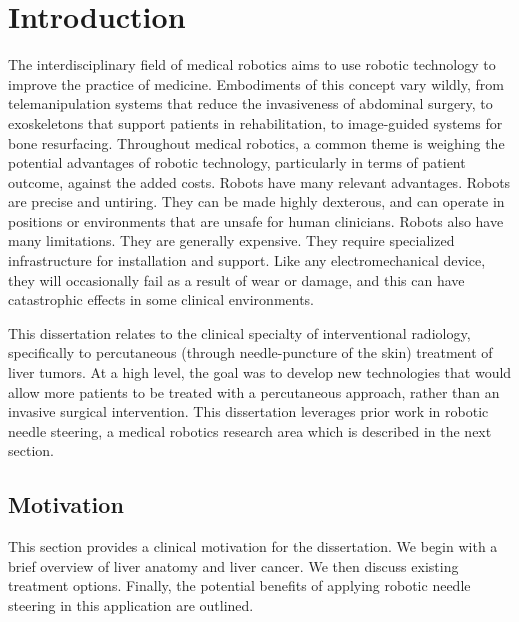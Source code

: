 \chapter{Introduction}
The interdisciplinary field of medical robotics aims to use robotic technology to improve the practice of medicine. Embodiments of this concept vary wildly, from telemanipulation systems that reduce the invasiveness of abdominal surgery, to exoskeletons that support patients in rehabilitation, to image-guided systems for bone resurfacing. Throughout medical robotics, a common theme is weighing the potential advantages of robotic technology, particularly in terms of patient outcome, against the added costs. Robots have many relevant advantages. Robots are precise and untiring. They can be made highly dexterous, and can operate in positions or environments that are unsafe for human clinicians. Robots also have many limitations. They are generally expensive. They require specialized infrastructure for installation and support. Like any electromechanical device, they will occasionally fail as a result of wear or damage, and this can have catastrophic effects in some clinical environments. 

This dissertation relates to the clinical specialty of interventional radiology, specifically to percutaneous (through needle-puncture of the skin) treatment of liver tumors. At a high level, the goal was to develop new technologies that would allow more patients to be treated with a percutaneous approach, rather than an invasive surgical intervention. This dissertation leverages prior work in robotic needle steering, a medical robotics research area which is described in the next section. 

\pagestyle{headings}
\setcounter{page}{1} 
\renewcommand{\thepage}{\arabic{page}}%

\section{Motivation}
This section provides a clinical motivation for the dissertation. We begin with a brief overview of liver anatomy and liver cancer. We then discuss existing treatment options. Finally, the potential benefits of applying robotic needle steering in this application are outlined.

